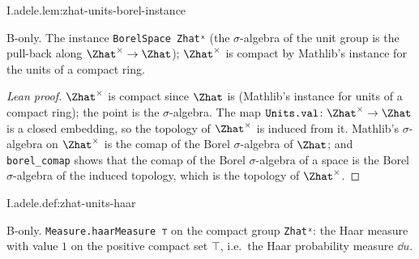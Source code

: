 \begin{lemma}
\bonly
{}
\end{lemma}
\begin{tfformal}{I.adele.lem:zhat-units-borel-instance}
\begin{tffidelity}
B-only. The instance \texttt{BorelSpace Zhatˣ} (the $\sigma$-algebra of the unit group is the pull-back along $\Zhat^\times\to\Zhat$); $\Zhat^\times$ is compact by Mathlib's instance for the units of a compact ring.
\end{tffidelity}
\end{tfformal}
\begin{proof}[Lean proof]
$\Zhat^\times$ is compact since $\Zhat$ is (Mathlib's instance for units of a compact ring); the point is the $\sigma$-algebra. The map $\texttt{Units.val}\colon\Zhat^\times\to\Zhat$ is a closed embedding, so the topology of $\Zhat^\times$ is induced from it. Mathlib's $\sigma$-algebra on $\Zhat^\times$ is the comap of the Borel $\sigma$-algebra of $\Zhat$; and \texttt{borel\_comap} shows that the comap of the Borel $\sigma$-algebra of a space is the Borel $\sigma$-algebra of the induced topology, which is the topology of $\Zhat^\times$.
\end{proof}

\begin{definition}
\bonly
{}
\end{definition}
\begin{tfformal}{I.adele.def:zhat-units-haar}
\begin{tffidelity}
B-only. \texttt{Measure.haarMeasure ⊤} on the compact group \texttt{Zhatˣ}: the Haar measure with value $1$ on the positive compact set $\top$, i.e.\ the Haar probability measure $\dd u$.
\end{tffidelity}
\end{tfformal}

